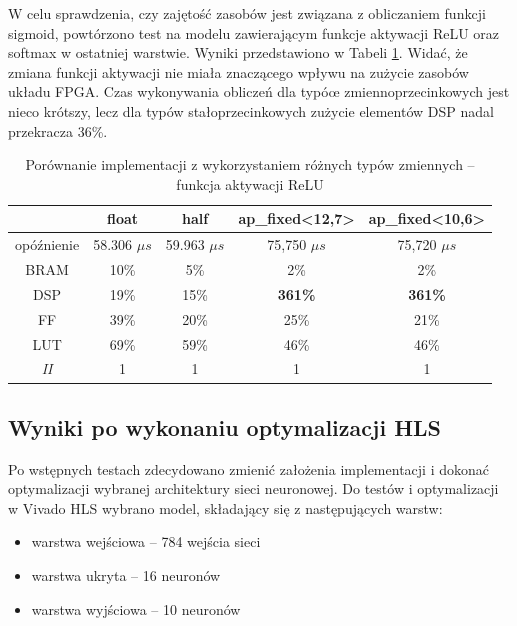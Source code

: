 W celu sprawdzenia, czy zajętość zasobów jest związana z obliczaniem funkcji sigmoid, powtórzono test na modelu zawierającym funkcje aktywacji ReLU oraz softmax w ostatniej warstwie. Wyniki przedstawiono w Tabeli \ref{tab:fixed-vs-float-relu}. Widać, że zmiana funkcji aktywacji nie miała znaczącego wpływu na zużycie zasobów układu FPGA. Czas wykonywania obliczeń dla typóœ zmiennoprzecinkowych jest nieco krótszy, lecz dla typów stałoprzecinkowych zużycie elementów DSP nadal przekracza 36\%.

\begin{table}[h] \centering
  \caption{Porównanie implementacji z wykorzystaniem różnych typów zmiennych -- funkcja aktywacji ReLU}
  \centering
  \begin{tabular} {c|c|c|c|c} \hline \label{tab:fixed-vs-float-relu}  
                  & float           & half            & ap\_fixed<12,7> & ap\_fixed<10,6> \\ \hline
    opóźnienie    & 58.306 $\mu s$  & 59.963 $\mu s$  & 75,750 $\mu s$  & 75,720 $\mu s$  \\
    BRAM          & 10\%             & 5\%             & 2\%             & 2\%            \\
    DSP           & 19\%            & 15\%             & \textbf{361\%}  & \textbf{361\%} \\
    FF            & 39\%            & 20\%            & 25\%            & 21\%            \\
    LUT           & 69\%            & 59\%            & 46\%            & 46\%            \\
    \emph{II}     & 1               & 1               & 1               & 1               \\
  \end{tabular}
\end{table}


\subsection{Wyniki po wykonaniu optymalizacji HLS}
Po wstępnych testach zdecydowano zmienić założenia implementacji i dokonać optymalizacji wybranej architektury sieci neuronowej. Do testów i optymalizacji w Vivado HLS wybrano model, składający się z następujących warstw:

\begin{itemize}
  \item warstwa wejściowa -- 784 wejścia sieci
  \item warstwa ukryta  -- 16 neuronów
  \item warstwa wyjściowa -- 10 neuronów
\end{itemize}

